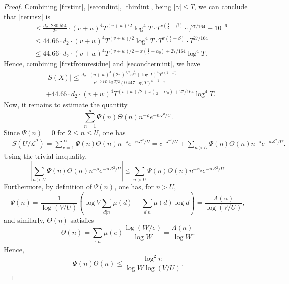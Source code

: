 \documentclass[reqno]{amsart}
\numberwithin{equation}{section}
\theoremstyle{remark}
\begin{document}
\begin{proof}
Combining \eqref{firstint}, \eqref{secondint}, \eqref{thirdint}, being $|\gamma|\le T$, we can conclude that \eqref{termsx} is
\begin{equation}\label{secondtermint}
\begin{aligned}
        &\le  \frac{d_2\cdot 280.594}{2\pi}\cdot (v+w)^4T^{(v+w)/2}\log^4T\cdot T^{x(\frac{1}{2}-\beta)} \cdot  \gamma^{27/164}+10^{-6}\\&\le  44.66\cdot d_2\cdot (v+w)^4T^{(v+w)/2}\log^4T\cdot T^{x(\frac{1}{2}-\beta)} \cdot  T^{27/164}\\&\le  44.66\cdot d_2\cdot (v+w)^4T^{(v+w)/2+x(\frac{1}{2}-\alpha_0)+27/164}\log^4T.
\end{aligned}
\end{equation}
Hence, combining \eqref{firstfromresidue} and \eqref{secondtermint}, we have
\begin{equation}\label{estimatesx}
\begin{aligned}
      &|S(X)|\le \frac{ d_2\cdot (u+w)^4(2\pi)^{1/2}e^{\frac{1}{6\gamma}}(\log T)^4T^{x(1-\beta)}}{e^{\pi\cdot 0.447 \log T/2}(0.447\log T)^{\beta-1+\frac{1}{2}}}\\&+ 44.66\cdot d_2\cdot (v+w)^4T^{(v+w)/2+x(\frac{1}{2}-\alpha_0)+27/164}\log^4T. 
\end{aligned}
\end{equation}
Now, it remains to estimate the quantity
\begin{equation*}
    \sum_{n=1}^{\infty}\Psi(n)\Theta(n) n^{-\rho}e^{-n \mathscr{L}^2 / U}.
\end{equation*}
Since $\Psi(n)=0$ for $2\le n\le U$, one has
\begin{equation}\label{eqsulu}
    \begin{aligned}
        &S(U/\mathscr{L}^2)=\sum_{n=1}^{\infty}\Psi(n)\Theta(n) n^{-\rho}e^{-n \mathscr{L}^2 / U}=e^{- \mathscr{L}^2 / U}+\sum_{n>U}\Psi(n)\Theta(n) n^{-\rho}e^{-n \mathscr{L}^2 / U}.
    \end{aligned}
\end{equation}
Using the trivial inequality,
\[
\left|\sum_{ n> U}\Psi(n)\Theta(n) n^{-\rho}e^{-n \mathscr{L}^2 / U}\right|\le \sum_{n > U}\Psi(n)\Theta(n)n^{-\alpha_0}e^{-n \mathscr{L}^2 / U}.
\]
Furthermore, by definition of $\Psi(n)$, one has, for $n>U$, 
\[
\Psi(n) = \frac{1}{\log (V/U)}\left(\log V\sum_{d | n}\mu(d) - \sum_{d | n}\mu(d)\log d\right) = \frac{\Lambda(n)}{\log(V/U)},
\]
and similarly, $\Theta(n)$ satisfies
\[
\Theta(n) = \sum_{e | n}\mu(e)\frac{\log(W/e)}{\log W} = \frac{\Lambda(n)}{\log W}.
\]
Hence,
\[
\Psi(n)\Theta(n) \le \frac{\log^2 n}{\log W \log (V/U)}.
\]
\end{proof}
\end{document}
